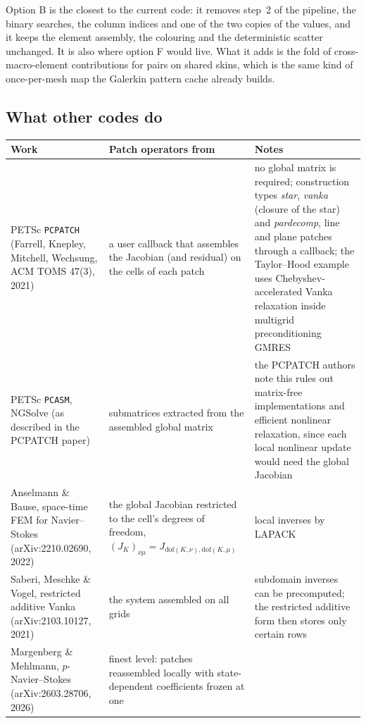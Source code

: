 \documentclass[11pt,a4paper]{article}
\newcommand{\code}[1]{\texttt{\small #1}}
\begin{document}
Option B is the closest to the current code: it removes step~2 of the pipeline, the binary
searches, the column indices and one of the two copies of the values, and it keeps the element
assembly, the colouring and the deterministic scatter unchanged. It is also where option F would
live. What it adds is the fold of cross-macro-element contributions for pairs on shared skins,
which is the same kind of once-per-mesh map the Galerkin pattern cache already builds.

\subsection{What other codes do}

\begin{center}
\small
\begin{tabular}{@{}>{\raggedright\arraybackslash}p{3.5cm}>{\raggedright\arraybackslash}p{5.1cm}>{\raggedright\arraybackslash}p{6.4cm}@{}}
\toprule
Work & Patch operators from & Notes \\
\midrule
PETSc \code{PCPATCH} (Farrell, Knepley, Mitchell, Wechsung, ACM TOMS 47(3), 2021) &
a user callback that assembles the Jacobian (and residual) on the cells of each patch &
no global matrix is required; construction types \emph{star}, \emph{vanka} (closure of the star)
and \emph{pardecomp}, line and plane patches through a callback; the Taylor--Hood example uses
Chebyshev-accelerated Vanka relaxation inside multigrid preconditioning GMRES \\[3pt]
PETSc \code{PCASM}, NGSolve (as described in the PCPATCH paper) &
submatrices extracted from the assembled global matrix &
the PCPATCH authors note this rules out matrix-free implementations and efficient nonlinear
relaxation, since each local nonlinear update would need the global Jacobian \\[3pt]
Anselmann \& Bause, space-time FEM for Navier--Stokes (arXiv:2210.02690, 2022) &
the global Jacobian restricted to the cell's degrees of freedom, $(J_K)_{\nu\mu} = J_{\mathrm{dof}(K,\nu),\mathrm{dof}(K,\mu)}$ &
local inverses by LAPACK \\[3pt]
Saberi, Meschke \& Vogel, restricted additive Vanka (arXiv:2103.10127, 2021) &
the system assembled on all grids &
subdomain inverses can be precomputed; the restricted additive form then stores only certain
rows \\[3pt]
Margenberg \& Mehlmann, $p$-Navier--Stokes (arXiv:2603.28706, 2026) &
finest level: patches reassembled locally with state-dependent coefficients frozen at one

\end{tabular}
\end{center}
\end{document}
